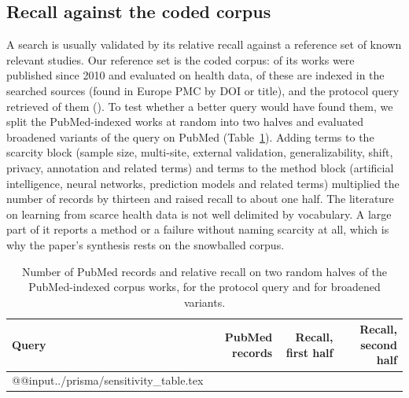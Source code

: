 \documentclass[acmsmall,screen,nonacm]{acmart}
\theoremstyle{acmdefinition}
\begin{document}
\subsection{Recall against the coded corpus}
A search is usually validated by its relative recall against a reference set of known relevant studies. Our reference set is the coded corpus: \PrismaCorpusInScope{} of its works were published since 2010 and evaluated on health data, \PrismaCorpusIndexed{} of these are indexed in the searched sources (found in Europe PMC by DOI or title), and the protocol query retrieved \PrismaCorpusRetrieved{} of them (\PrismaRecall). To test whether a better query would have found them, we split the \PrismaSensPubmedCorpus{} PubMed-indexed works at random into two halves and evaluated broadened variants of the query on PubMed (Table~\ref{tab:sens}). Adding \PrismaSensExtraScarcity{} terms to the scarcity block (sample size, multi-site, external validation, generalizability, shift, privacy, annotation and related terms) and \PrismaSensExtraMethod{} terms to the method block (artificial intelligence, neural networks, prediction models and related terms) multiplied the number of records by thirteen and raised recall to about one half. The literature on learning from scarce health data is not well delimited by vocabulary. A large part of it reports a method or a failure without naming scarcity at all, which is why the paper's synthesis rests on the snowballed corpus.

\begin{table}[t]
\caption{Number of PubMed records and relative recall on two random halves of the PubMed-indexed corpus works, for the protocol query and for broadened variants.}
\label{tab:sens}
\footnotesize
\begin{tabular}{@{}lrrr@{}}
\toprule
Query & PubMed records & Recall, first half & Recall, second half\\
\midrule
\csname @@input\endcsname ../prisma/sensitivity_table.tex 
\bottomrule
\end{tabular}
\end{table}
\end{document}
